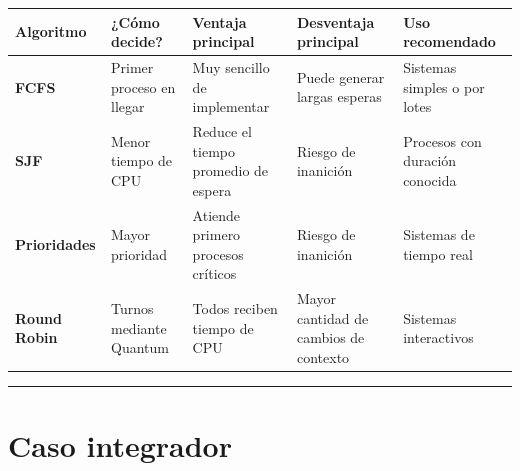 \documentclass[
  spanish,
  letterpaper,
]{scrbook}
\newcounter{none} %
\begin{document}
{\def\LTcaptype{none} %
\begin{longtable}[]{@{}
  >{\raggedright\arraybackslash}p{}
  >{\raggedright\arraybackslash}p{}
  >{\raggedright\arraybackslash}p{}
  >{\raggedright\arraybackslash}p{}
  >{\raggedright\arraybackslash}p{}@{}}
\toprule\noalign{}
\begin{minipage}[b]{\linewidth}\raggedright
Algoritmo
\end{minipage} & \begin{minipage}[b]{\linewidth}\raggedright
¿Cómo decide?
\end{minipage} & \begin{minipage}[b]{\linewidth}\raggedright
Ventaja principal
\end{minipage} & \begin{minipage}[b]{\linewidth}\raggedright
Desventaja principal
\end{minipage} & \begin{minipage}[b]{\linewidth}\raggedright
Uso recomendado
\end{minipage} \\
\midrule\noalign{}
\endhead
\bottomrule\noalign{}
\endlastfoot
\textbf{FCFS} & Primer proceso en llegar & Muy sencillo de implementar &
Puede generar largas esperas & Sistemas simples o por lotes \\
\textbf{SJF} & Menor tiempo de CPU & Reduce el tiempo promedio de espera
& Riesgo de inanición & Procesos con duración conocida \\
\textbf{Prioridades} & Mayor prioridad & Atiende primero procesos
críticos & Riesgo de inanición & Sistemas de tiempo real \\
\textbf{Round Robin} & Turnos mediante Quantum & Todos reciben tiempo de
CPU & Mayor cantidad de cambios de contexto & Sistemas interactivos \\
\end{longtable}
}

\begin{center}\rule{0.5\linewidth}{0.5pt}\end{center}


\chapter{Caso integrador}\label{caso-integrador}
\end{document}
